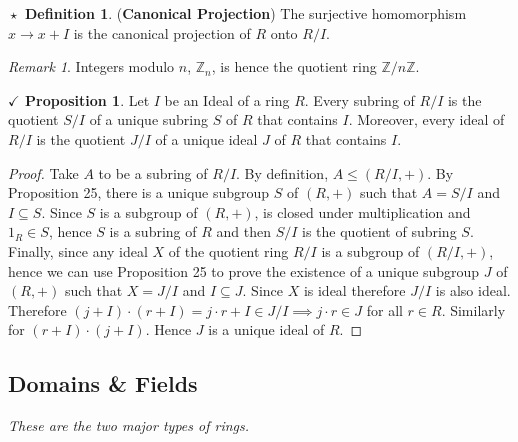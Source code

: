 \documentclass{article}
\theoremstyle{definition}
\newtheorem{definition}{$\boxed{\star}$ Definition}
\theoremstyle{remark}
\newtheorem*{remark}{Remark}
\theoremstyle{definition}
\theoremstyle{definition}
\newtheorem{proposition}{$\checkmark$ Proposition}
\theoremstyle{definition}
\theoremstyle{proof}
\begin{document}
\begin{definition}
	(\textbf{Canonical Projection}) The surjective homomorphism $ x\longrightarrow x+I $ is the canonical projection of $ R $ onto $ R/I $.
\end{definition}
\begin{remark}
	Integers modulo $ n $, $ \mathbb{Z}_n $, is hence the quotient ring $ \mathbb{Z}/ n\mathbb{Z} $.
\end{remark}
\hrulefill
\begin{proposition}
	Let $ I $ be an Ideal of a ring $ R $. Every subring of $ R/I $ is the quotient $ S/I $ of a unique subring $ S $ of $ R $ that contains $ I $. Moreover, every ideal of $ R/I $ is the quotient $ J/I $ of a unique ideal $ J $ of $ R $ that contains $ I $.
\end{proposition}
\begin{proof}
	Take $ A $ to be a subring of $ R/I $. By definition, $ A \le (R/I,+)$. By Proposition 25, there is a unique subgroup $ S $ of $ (R,+) $ such that $ A = S/I $ and $ I\subseteq S $. Since $ S $ is a subgroup of $ (R,+) $, is closed under multiplication and $ 1_R \in S $, hence $ S $ is a subring of $ R $ and then $ S/I $ is the quotient of subring $ S $. Finally, since any ideal $ X $ of the quotient ring $ R/I $ is a subgroup of $ (R/I,+) $, hence we can use Proposition 25 to prove the existence of a unique subgroup $ J $ of $ (R,+) $ such that $ X=J/I $ and $ I\subseteq J $. Since $ X $ is ideal therefore $ J/I $ is also ideal. Therefore $ (j + I)\cdot (r+I) = j\cdot r + I \in J/I \implies j\cdot r \in J$ for all $ r\in R $. Similarly for $ (r+I)\cdot (j+I) $. Hence $ J $ is a unique ideal of $ R $.
\end{proof}
\hrulefill
\newpage
\subsection{Domains \& Fields}
\emph{These are the two major types of rings.}
\end{document}
